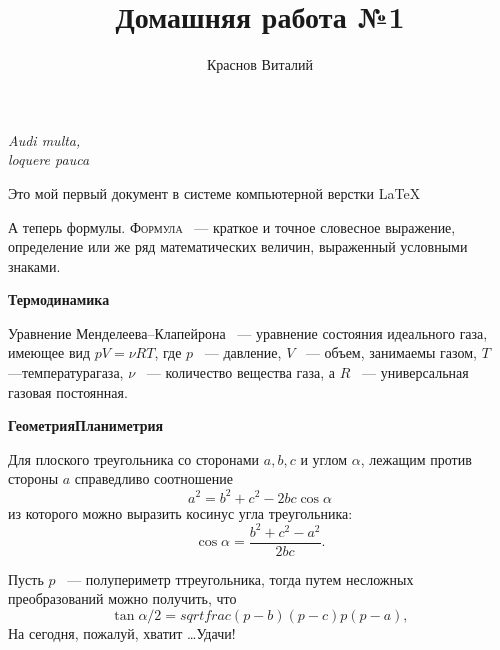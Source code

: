 \documentclass[12pt]{article}
\title{Домашняя работа №1}
\author{Краснов Виталий}
\date{}
\begin{document}
	\maketitle
	\begin{flushright}
		\itshape{Audi multa,\\loquere pauca}
	\end{flushright}
	\begin{center}
		\vspace{20pt}
		Это мой первый документ в системе компьютерной верстки \LaTeX\\\huge{}
	\end{center}
	
	\par 
	А теперь формулы. \textsc{Формула}~ --- краткое и точное словесное выражение, определение или же ряд математических величин, выраженный условными знаками.
	
	\vspace{15pt}\hspace{28pt}\textbf{\large{Термодинамика}}
	
	\par Уравнение Менделеева--Клапейрона~ --- уравнение состояния идеального газа, имеющее вид $pV = \nu RT$, где $p$~ --- давление, $V$~ --- объем, занимаемы газом, $T$~ ---температурагаза, $\nu$~ --- количество вещества газа, а $R$~ --- универсальная газовая постоянная.
	
	\vspace{15pt}\hspace{28pt}\textbf{\large{Геометрия}\hfill\large{Планиметрия}}
	\par Для плоского треугольника со сторонами $a, b, c$ и углом $\alpha$, лежащим против стороны $a$ справедливо соотношение $$ a^2 = b^2 + c^2 - 2bc\cos{\alpha} $$ из которого можно выразить косинус угла треугольника: $$ \cos{\alpha} = \frac{b^2 + c^2 - a^2}{2bc}. $$
	\par Пусть $p$~ --- полупериметр ттреугольника, тогда путем несложных преобразований можно получить, что $$ \tan{\alpha/2} =  sqrt{frac{(p - b)(p - c)}{p(p - a)}}, $$ \vspace{1cm} На сегодня, пожалуй, хватит \dots Удачи!
	
	
\end{document}
